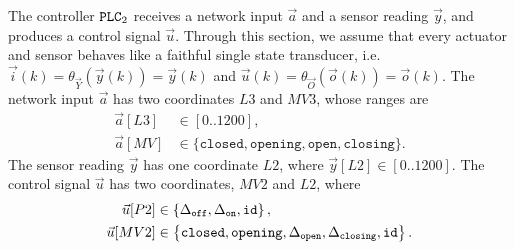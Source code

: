 {The controller $\texttt{PLC}_2$ receives a network input $\vec{a}$ and a sensor reading $\vec{y}$, and produces a control signal $\vec{u}$. Through this section, we assume that every actuator and sensor behaves like a faithful single state transducer, i.e. $\vec{i}(k)=\theta_{\vec{Y}}(\vec{y}(k))=\vec{y}(k)$ and $\vec{u}(k)=\theta_{\vec{O}}(\vec{o}(k))=\vec{o}(k)$. 
The network input $\vec{a}$ has two coordinates $L3$ and $MV3$, whose ranges are 
\begin{align*}
  \vec{a}[L3]&\in[0..1200],\\ 
  \vec{a}[MV]&\in \{\texttt{closed},\texttt{opening},\texttt{open},\texttt{closing}\}.
\end{align*} 
The sensor reading $\vec{y}$ has one coordinate $L2$, where $\vec{y}[L2]\in[0..1200]$. 
The control signal $\vec{u}$ has two coordinates, $MV2$ and $L2$, where 
\begin{align*}
  \vec{u}[P2]&\in\left\{{\Delta}_\texttt{off},{\Delta}_\texttt{on},{\texttt{id}}\right\},\\
  \vec{u}[MV2]&\in\left\{\texttt{closed},\texttt{opening},{\Delta}_\texttt{open},{\Delta}_\texttt{closing}, {\texttt{id}}\right\}.
\end{align*}

}
